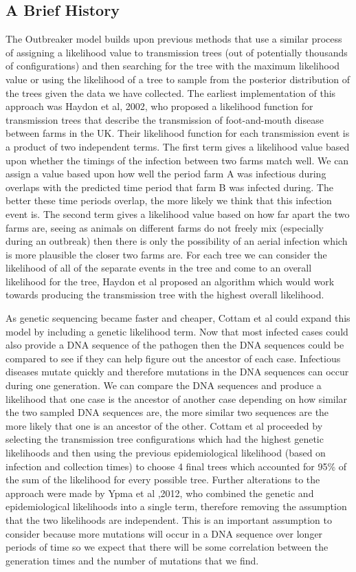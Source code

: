 \documentclass{article}
\begin{document}
\subsection{A Brief History}
The Outbreaker model builds upon previous methods that use a similar process of assigning a likelihood value to transmission trees (out of potentially thousands of configurations) and then searching for the tree with the maximum likelihood value or using the likelihood of a tree to sample from the posterior distribution of the trees given the data we have collected. The earliest implementation of this approach was Haydon et al, 2002, who proposed a likelihood function for transmission trees that describe the transmission of foot-and-mouth disease between farms in the UK. Their likelihood function for each transmission event is a product of two independent terms. The first term gives a likelihood value based upon whether the timings of the infection between two farms match well. We can assign a value based upon how well the period farm A was infectious during overlaps with the predicted time period that farm B was infected during. The better these time periods overlap, the more likely we think that this infection event is. The second term gives a likelihood value based on how far apart the two farms are, seeing as animals on different farms do not freely mix (especially during an outbreak) then there is only the possibility of an aerial infection which is more plausible the closer two farms are. For each tree we can consider the likelihood of all of the separate events in the tree and come to an overall likelihood for the tree, Haydon et al proposed an algorithm which would work towards producing the transmission tree with the highest overall likelihood.

As genetic sequencing became faster and cheaper, Cottam et al could expand this model by including a genetic likelihood term. Now that most infected cases could also provide a DNA sequence of the pathogen then the DNA sequences could be compared to see if they can help figure out the ancestor of each case. Infectious diseases mutate quickly and therefore mutations in the DNA sequences can occur during one generation. We can compare the DNA sequences and produce a likelihood that one case is the ancestor of another case depending on how similar the two sampled DNA sequences are, the more similar two sequences are the more likely that one is an ancestor of the other. Cottam et al proceeded by selecting the transmission tree configurations which had the highest genetic likelihoods and then using the previous epidemiological likelihood (based on infection and collection times) to choose 4 final trees which accounted for 95\% of the sum of the likelihood for every possible tree. Further alterations to the approach were made by Ypma et al ,2012, who combined the genetic and epidemiological likelihoods into a single term, therefore removing the assumption that the two likelihoods are independent. This is an important assumption to consider because more mutations will occur in a DNA sequence over longer periods of time so we expect that there will be some correlation between the generation times and the number of mutations that we find.
\end{document}
